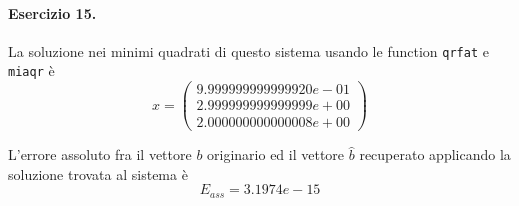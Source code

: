 \paragraph{Esercizio 15.} La soluzione nei minimi quadrati di questo sistema usando le function \verb|qrfat| e \verb|miaqr| è
\[
x = \begin{pmatrix}
9.999999999999920e-01\\
2.999999999999999e+00\\
2.000000000000008e+00
\end{pmatrix}
\]

L'errore assoluto fra il vettore $b$ originario ed il vettore $\hat{b}$ recuperato applicando la soluzione trovata al sistema è
\[
E_{ass} = 3.1974e-15
\]